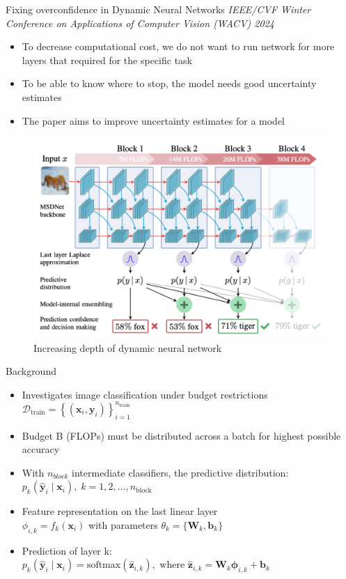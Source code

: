 \begin{frame}{Fixing overconfidence in Dynamic Neural Networks}
    \textit{IEEE/CVF Winter Conference on Applications of Computer Vision (WACV) 2024
    }
    
    \begin{itemize}
        \item To decrease computational cost, we do not want to run network for more layers that required for the specific task
        \item To be able to know where to stop, the model needs good uncertainty estimates 
        \item The paper aims to improve uncertainty estimates for a model
    \end{itemize}
    \begin{figure}
        \centering
        \includegraphics[width=0.4\linewidth]{Screenshot 2025-04-08 at 15.02.28.png}
        \caption{Increasing depth of dynamic neural network}
        \label{fig:enter-label}
    \end{figure}
    \end{frame}
    
    \begin{frame}{Background}
    
    \begin{itemize}
        \item Investigates image classification under budget restrictions \\
        \(\mathcal{D}_{\text{train}} = \left\{ (\mathbf{x}_i, \mathbf{y}_i) \right\}_{i=1}^{n_{\text{train}}}\)
        \item Budget B (FLOPs) must be distributed across a batch for highest possible accuracy
        \item With $n_{block}$ intermediate classifiers, the predictive distribution: \\
        \( p_k(\hat{\mathbf{y}}_i \mid \mathbf{x}_i),\; k = 1, 2, \ldots, n_{\text{block}} \)
        \item Feature representation on the last linear layer \\
        \( \phi_{i,k} = f_k(\mathbf{x}_i) \) with parameters \( \theta_k = \{ \mathbf{W}_k, \mathbf{b}_k \} \)
        \item Prediction of layer k: \\
        \( p_k(\hat{\mathbf{y}}_i \mid \mathbf{x}_i) = \text{softmax}(\hat{\mathbf{z}}_{i,k}), \text{ where } \hat{\mathbf{z}}_{i,k} = \mathbf{W}_k \boldsymbol{\phi}_{i,k} + \mathbf{b}_k \)
    
    
    
    \end{itemize}
    
    \end{frame}
    
